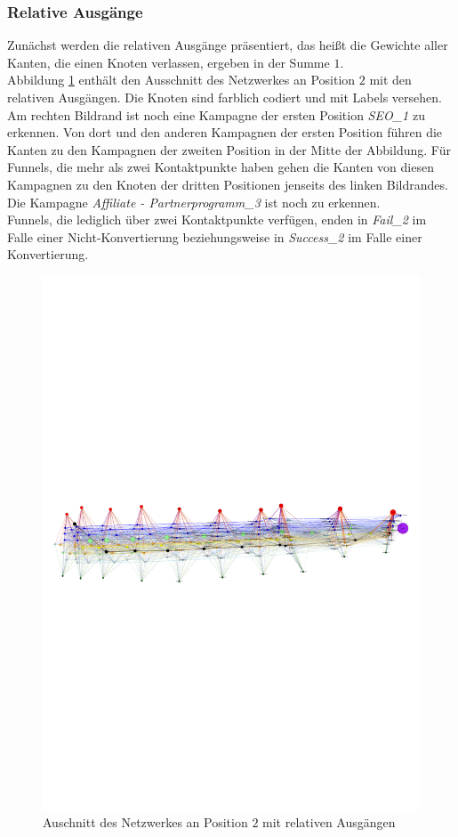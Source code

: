 \subsubsection*{Relative Ausgänge}

Zunächst werden die relativen Ausgänge präsentiert, das heißt die Gewichte aller Kanten, die einen Knoten verlassen, ergeben in der Summe $1$.\\
Abbildung \ref{out_labels} enthält den Ausschnitt des Netzwerkes an Position $2$ mit den relativen Ausgängen. Die Knoten sind farblich codiert und mit Labels versehen. Am rechten Bildrand ist noch eine Kampagne der ersten Position \textit{SEO\_1} zu erkennen. Von dort und den anderen Kampagnen der ersten Position führen die Kanten zu den Kampagnen der zweiten Position in der Mitte der Abbildung. Für Funnels, die mehr als zwei Kontaktpunkte haben gehen die Kanten von diesen Kampagnen zu den Knoten der dritten Positionen jenseits des linken Bildrandes. Die Kampagne \textit{Affiliate - Partnerprogramm\_3} ist noch zu erkennen.\\
Funnels, die lediglich über zwei Kontaktpunkte verfügen, enden in \textit{Fail\_2} im Falle einer Nicht-Konvertierung beziehungsweise in \textit{Success\_2} im Falle einer Konvertierung.
\begin{figure}[H]
	\centering\includegraphics[scale=2.5]{out_labels.pdf}\caption[Relative Ausgänge]{Auschnitt des Netzwerkes an Position $2$ mit relativen Ausgängen}\label{out_labels}
\end{figure}
